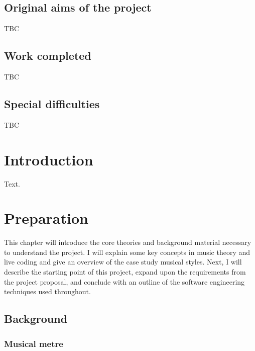 \documentclass[12pt,twoside,openright]{report}
\begin{document}
\section*{Original aims of the project}

TBC


\section*{Work completed}

TBC

\section*{Special difficulties}

TBC
 
\newpage
\tableofcontents


\pagestyle{headings}

\chapter{Introduction}

Text.



\chapter{Preparation}

This chapter will introduce the core theories and background material necessary
to understand the project. I will explain some key concepts in music theory and
live coding and give an overview of the case study musical styles. Next, I will
describe the starting point of this project, expand upon the requirements from
the project proposal, and conclude with an outline of the software engineering
techniques used throughout.



\section{Background} \label{background}


\subsection{Musical metre} \label{metre_background}
\end{document}

